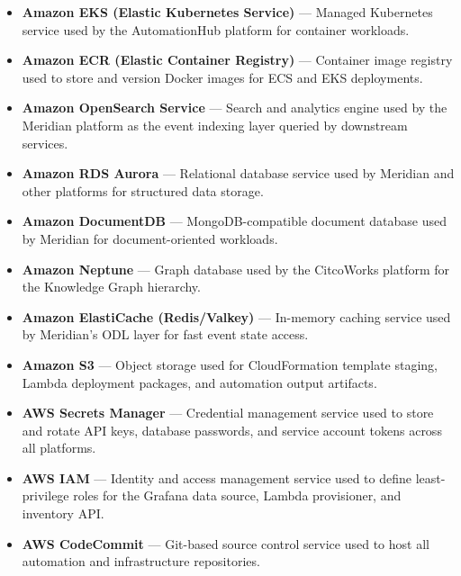 \begin{itemize}
    \item \textbf{Amazon EKS (Elastic Kubernetes Service)} --- Managed
          Kubernetes service used by the AutomationHub platform for
          container workloads.

    \item \textbf{Amazon ECR (Elastic Container Registry)} --- Container
          image registry used to store and version Docker images for
          ECS and EKS deployments.

    \item \textbf{Amazon OpenSearch Service} --- Search and analytics
          engine used by the Meridian platform as the event indexing
          layer queried by downstream services.

    \item \textbf{Amazon RDS Aurora} --- Relational database service
          used by Meridian and other platforms for structured data storage.

    \item \textbf{Amazon DocumentDB} --- MongoDB-compatible document
          database used by Meridian for document-oriented workloads.

    \item \textbf{Amazon Neptune} --- Graph database used by the
          CitcoWorks platform for the Knowledge Graph hierarchy.

    \item \textbf{Amazon ElastiCache (Redis/Valkey)} --- In-memory
          caching service used by Meridian's ODL layer for fast
          event state access.

    \item \textbf{Amazon S3} --- Object storage used for CloudFormation
          template staging, Lambda deployment packages, and automation
          output artifacts.

    \item \textbf{AWS Secrets Manager} --- Credential management service
          used to store and rotate API keys, database passwords, and
          service account tokens across all platforms.

    \item \textbf{AWS IAM} --- Identity and access management service
          used to define least-privilege roles for the Grafana data
          source, Lambda provisioner, and inventory API.

    \item \textbf{AWS CodeCommit} --- Git-based source control service
          used to host all automation and infrastructure repositories.

\end{itemize}


